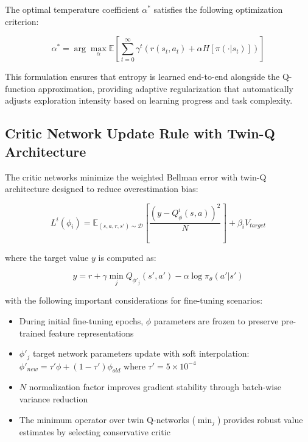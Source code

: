 \documentclass[10pt,twocolumn,letterpaper]{article}
\begin{document}
The optimal temperature coefficient $\alpha^*$ satisfies the following optimization criterion:

\begin{equation}
    \alpha^* = \arg\max_\alpha \mathbb{E}\left[\sum_{t=0}^\infty \gamma^t \left(r(s_t,a_t) + \alpha H[\pi(\cdot|s_t)]\right)\right]
    \label{eq:alpha_optimization}
\end{equation}

This formulation ensures that entropy is learned end-to-end alongside the Q-function approximation, providing adaptive regularization that automatically adjusts exploration intensity based on learning progress and task complexity.

\subsection{Critic Network Update Rule with Twin-Q Architecture}

The critic networks minimize the weighted Bellman error with twin-Q architecture designed to reduce overestimation bias:

\begin{equation}
    L^i(\phi_i) = \mathbb{E}_{(s,a,r,s') \sim \mathcal{D}}\left[\frac{(y - Q_\phi^i(s,a))^2}{N}\right] + \beta_i V_{target}
    \label{eq:critic_loss}
\end{equation}

where the target value $y$ is computed as:

\begin{equation}
    y = r + \gamma\min_j Q_{\phi'_j}(s',a') - \alpha\log\pi_\theta(a'|s')
    \label{eq:target_value}
\end{equation}

with the following important considerations for fine-tuning scenarios:
\begin{itemize}
    \item During initial fine-tuning epochs, $\phi$ parameters are frozen to preserve pre-trained feature representations
    \item $\phi'_j$ target network parameters update with soft interpolation: $\phi'_{new} = \tau'\phi + (1-\tau')\phi_{old}$ where $\tau' = 5\times10^{-4}$
    \item $N$ normalization factor improves gradient stability through batch-wise variance reduction
    \item The minimum operator over twin Q-networks ($\min_j$) provides robust value estimates by selecting conservative critic
\end{itemize}
\end{document}

